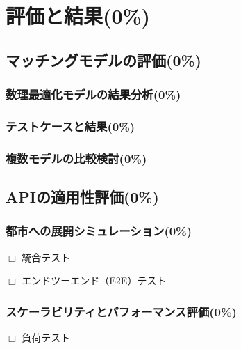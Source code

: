 \section{評価と結果(0\%)}
  \label{sec:評価と結果}
    \par
  
  \subsection{マッチングモデルの評価(0\%)}
    \label{sec:マッチングモデルの評価}
      \par
  
      \subsubsection{数理最適化モデルの結果分析(0\%)}
        \label{sec:数理最適化モデルの結果分析}
          \par

      \subsubsection{テストケースと結果(0\%)}
        \label{sec:テストケースと結果}
          \par
          
      \subsubsection{複数モデルの比較検討(0\%)}
        \label{sec:複数モデルの比較検討}
          \par
      
  \subsection{APIの適用性評価(0\%)}
    \label{sec:APIの適用性評価}
      \par
      
      \subsubsection{都市への展開シミュレーション(0\%)}
        \label{sec:都市への展開シミュレーション}
          \par $\Box$ 統合テスト
          \par $\Box$ エンドツーエンド（E2E）テスト
          
      \subsubsection{スケーラビリティとパフォーマンス評価(0\%)}
        \label{sec:スケーラビリティとパフォーマンス評価}
          \par $\Box$ 負荷テスト
